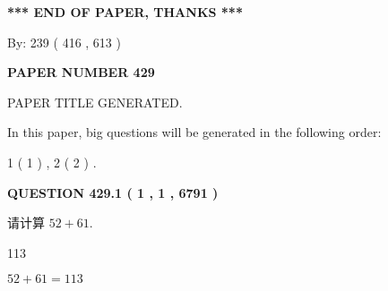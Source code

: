 \documentclass{ctexart}
\begin{document}
   
   
   
\vspace{1.0in} 
{\textbf{\large{ *** END OF PAPER, THANKS *** }}} 
   
   
\hspace{1.0in} By: 
 239 ( 416 ,  613 )
   
   
   
   
\newpage 
\setcounter{page}{ 
   429001 } 
   
   
   
   
 {\textbf{ \Large{ PAPER NUMBER  429  }}}
   
   
\vspace{0.2in}
   
   
   
   
   
   
   
   
 \vspace{0.2in}
 
 
 
 
   
   
 PAPER TITLE GENERATED.
   
   
   
\vspace{0.2in}
   
In this paper, big questions will be generated in the following order: 
   
   
   1 ( 1 )
 ,
   2 ( 2 )
 .
  
\vspace{0.2in}
  
{\textbf{\Large{QUESTION
429.1 
 ( 1 , 1 , 6791 )
}}}
  
  
 
请计算 $ %
52 +  %
61 $.
 
 
 
\noindent{}
 
 

113
 
 
\noindent{}
 
 

 
 
 
\noindent{}
 
 

$ %
52 +  %
61=   %
113$
 
\end{document}
